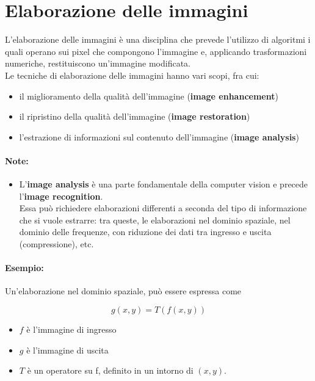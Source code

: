 \section{Elaborazione delle immagini}

L'elaborazione delle immagini è una disciplina che prevede l'utilizzo
di algoritmi i quali operano sui pixel che compongono l'immagine
e, applicando trasformazioni numeriche, restituiscono un'immagine
modificata.\\
Le tecniche di elaborazione delle immagini hanno vari scopi, fra cui:

\begin{itemize}
    \item il miglioramento della qualità dell'immagine (\textbf{image enhancement})
    \item il ripristino della qualità dell'immagine (\textbf{image restoration})
    \item l'estrazione di informazioni sul contenuto dell'immagine (\textbf{image analysis})
\end{itemize}

\paragraph{Note:}

\begin{itemize}
    \item L'\textbf{image analysis} è una parte fondamentale della computer vision e
          precede l'\textbf{image recognition}.\\
          Essa può richiedere elaborazioni differenti a seconda del tipo di
          informazione che si vuole estrarre: tra queste, le elaborazioni nel
          dominio spaziale, nel dominio delle frequenze, con riduzione dei
          dati tra ingresso e uscita (compressione), etc.
\end{itemize}

\paragraph{Esempio:}

Un'elaborazione nel dominio spaziale, può essere
espressa come

$$
    g(x , y) = T(f (x , y))
$$

\begin{itemize}
    \item $f$ è l'immagine di ingresso
    \item $g$ è l'immagine di uscita
    \item $T$ è un operatore su f, definito in un intorno di $(x , y)$.
\end{itemize}

